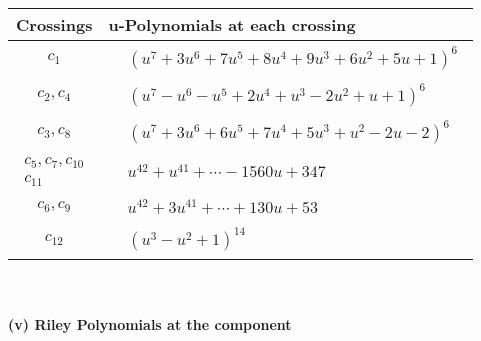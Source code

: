 \documentclass[1p]{elsarticle_modified}
\theoremstyle{definition}
\begin{document}
\begin{tabular}{m{50pt}|m{274pt}}
Crossings & \hspace{64pt}u-Polynomials at each crossing \\
\hline $$\begin{aligned}c_{1}\end{aligned}$$&$\begin{aligned}
&(u^7+3 u^6+7 u^5+8 u^4+9 u^3+6 u^2+5 u+1)^6
\end{aligned}$\\
\hline $$\begin{aligned}c_{2},c_{4}\end{aligned}$$&$\begin{aligned}
&(u^7- u^6- u^5+2 u^4+u^3-2 u^2+u+1)^6
\end{aligned}$\\
\hline $$\begin{aligned}c_{3},c_{8}\end{aligned}$$&$\begin{aligned}
&(u^7+3 u^6+6 u^5+7 u^4+5 u^3+u^2-2 u-2)^6
\end{aligned}$\\
\hline $$\begin{aligned}c_{5},c_{7},c_{10}\\c_{11}\end{aligned}$$&$\begin{aligned}
&u^{42}+u^{41}+\cdots-1560 u+347
\end{aligned}$\\
\hline $$\begin{aligned}c_{6},c_{9}\end{aligned}$$&$\begin{aligned}
&u^{42}+3 u^{41}+\cdots+130 u+53
\end{aligned}$\\
\hline $$\begin{aligned}c_{12}\end{aligned}$$&$\begin{aligned}
&(u^3- u^2+1)^{14}
\end{aligned}$\\
\hline
\end{tabular}\\~\\
\newpage\renewcommand{\arraystretch}{1}
\flushleft \textbf{(v) Riley Polynomials at the component}\newline \\
\end{document}
